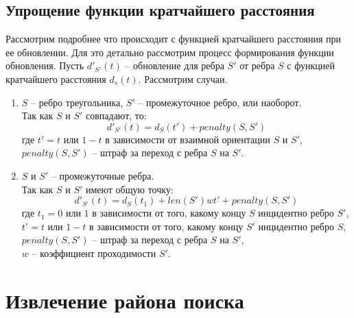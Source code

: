 \subsection{Упрощение функции кратчайшего расстояния}
Рассмотрим подробнее что происходит с функцией кратчайшего расстояния
при ее обновлении. Для это детально рассмотрим процесс формирования
функции обновления. Пусть $d'_{S'}(t)$ -- обновление для ребра $S'$ от ребра
$S$ с функцией кратчайшего расстояния $d_s(t)$. Рассмотрим случаи.
\begin{enumerate}
\item $S$ -- ребро треугольника, $S'$ -- промежуточное ребро, или наоборот.\\
Так как $S$ и $S'$ совпадают, то:
\begin{equation} \label{eq:itd}
d'_{S'}(t) = d_S(t') + penalty(S, S')
\end{equation}
где $t' = t$ или $1 - t$ в зависимости от взаимной ориентации $S$ и $S'$,\\
$penalty(S, S')$ -- штраф за переход с ребра $S$ на $S'$.
\item $S$ и $S'$ -- промежуточные ребра.\\
Так как $S$ и $S'$ имеют общую точку:
\begin{equation} \label{eq:iid}
d'_{S'}(t) = d_S(t_1) + len(S')wt' + penalty(S, S')
\end{equation}
где $t_1 = 0$ или $1$ в зависимости от того, какому концу $S$
инцидентно ребро  $S'$,\\
$t' = t$ или $1 - t$ в зависимости от того, какому концу $S'$
инцидентно ребро $S$,\\
$penalty(S, S')$ -- штраф за переход с ребра $S$ на $S'$,\\
$w$ -- коэффициент проходимости $S'$.
\end{enumerate}

\section{Извлечение района поиска}
